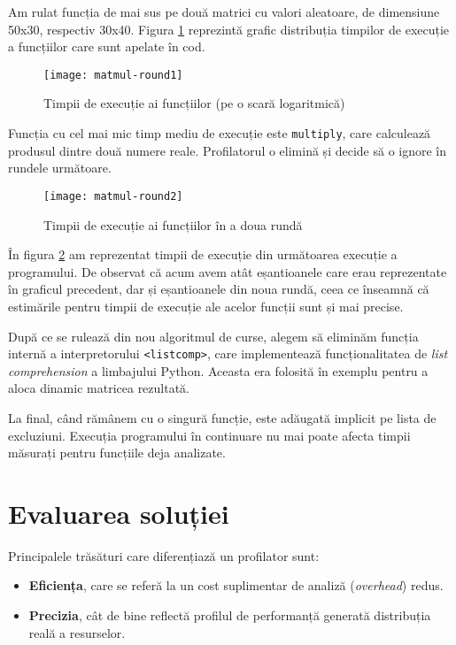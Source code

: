 Am rulat funcția de mai sus pe două matrici cu valori aleatoare, de dimensiune 50x30, respectiv 30x40. Figura \ref{fig:matmul_first_round} reprezintă grafic distribuția timpilor de execuție a funcțiilor care sunt apelate în cod.

\begin{figure}[h]
    \centering
    \texttt{[image: matmul-round1]}
    \caption{Timpii de execuție ai funcțiilor (pe o scară logaritmică)}
    \label{fig:matmul_first_round}
\end{figure}

Funcția cu cel mai mic timp mediu de execuție este \texttt{multiply}, care calculează produsul dintre două numere reale. Profilatorul o elimină și decide să o ignore în rundele următoare.

\begin{figure}[ht]
    \centering
    \texttt{[image: matmul-round2]}
    \caption{Timpii de execuție ai funcțiilor în a doua rundă}
    \label{fig:matmul_second_round}
\end{figure}

În figura \ref{fig:matmul_second_round} am reprezentat timpii de execuție din următoarea execuție a programului. De observat că acum avem atât eșantioanele care erau reprezentate în graficul precedent, dar și eșantioanele din noua rundă, ceea ce înseamnă că estimările pentru timpii de execuție ale acelor funcții sunt și mai precise.

După ce se rulează din nou algoritmul de curse, alegem să eliminăm funcția internă a interpretorului \texttt{<listcomp>}, care implementează funcționalitatea de \textit{list comprehension} a limbajului Python. Aceasta era folosită în exemplu pentru a aloca dinamic matricea rezultată.

La final, când rămânem cu o singură funcție, este adăugată implicit pe lista de excluziuni. Execuția programului în continuare nu mai poate afecta timpii măsurați pentru funcțiile deja analizate.

\section{Evaluarea soluției}

Principalele trăsături care diferențiază un profilator sunt:
\begin{itemize}
    \item \textbf{Eficiența}, care se referă la un cost suplimentar de analiză (\textit{overhead}) redus.
    \item \textbf{Precizia}, cât de bine reflectă profilul de performanță generată distribuția reală a resurselor.
\end{itemize}

